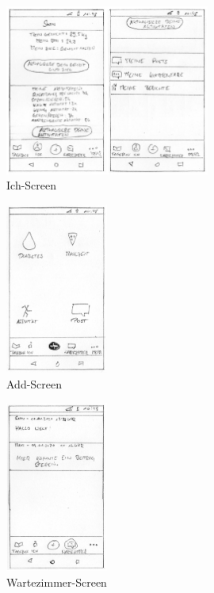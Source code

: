 \begin{figure}[H]
	\centering
	\includegraphics[width=0.6\textwidth]{images/ichscreen.png}
	\captionsetup{justification=centering}
	\caption{Ich-Screen}
	\label{img:ichscreen}
\end{figure}
\begin{figure}[H]
	\centering
	\includegraphics[width=0.3\textwidth]{images/addscreen.png}
	\captionsetup{justification=centering}
	\caption{Add-Screen}
	\label{img:addscreen}
\end{figure}
\begin{figure}[H]
	\centering
	\includegraphics[width=0.3\textwidth]{images/wartezimmerscreen.png}
	\captionsetup{justification=centering}
	\caption{Wartezimmer-Screen}
	\label{img:wartezimmerscreen}
\end{figure}
